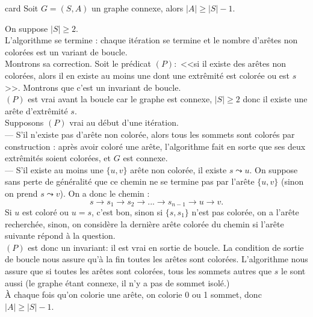 \documentclass[french, 11pt]{article}
\begin{document}
\begin{prop}{}{card}
    Soit $G=(S,A)$ un graphe connexe, alors $|A|\geq|S|-1$.
    \tcblower
    \begin{algorithm}[H]
        \caption{}
    \end{algorithm}
    On suppose $|S|\geq2$.\\
    L'algorithme se termine : chaque itération se termine et le nombre d'arêtes non colorées est un variant de boucle.\\
    Montrons sa correction. Soit le prédicat $(P):$ <<si il existe des arêtes non colorées, alors il en existe au moins une dont une extrêmité est colorée ou est $s$>>. Montrons que c'est un invariant de boucle.\\
    $(P)$ est vrai avant la boucle car le graphe est connexe, $|S|\geq2$ donc il existe une arête d'extrêmité $s$.\\
    Supposons $(P)$ vrai au début d'une itération.\\
    --- S'il n'existe pas d'arête non colorée, alors tous les sommets sont colorés par construction : après avoir coloré une arête, l'algorithme fait en sorte que ses deux extrêmités soient colorées, et $G$ est connexe.\\
    --- S'il existe au moins une $\{u,v\}$ arête non colorée, il existe $s\leadsto u$. On suppose sans perte de généralité que ce chemin ne se termine pas par l'arête $\{u,v\}$ (sinon on prend $s\leadsto v$). On a donc le chemin : \begin{equation*}s\to s_1 \to s_2 \to ... \to s_{n-1} \to u \to v.\end{equation*}
    Si $u$ est coloré ou $u=s$, c'est bon, sinon si $\{s,s_1\}$ n'est pas colorée, on a l'arête recherchée, sinon, on considère la dernière arête colorée du chemin si l'arête suivante répond à la question.\\
    $(P)$ est donc un invariant: il est vrai en sortie de boucle. La condition de sortie de boucle nous assure qu'à la fin toutes les arêtes sont colorées. L'algorithme nous assure que si toutes les arêtes sont colorées, tous les sommets autres que $s$ le sont aussi (le graphe étant connexe, il n'y a pas de sommet isolé.)\\
    À chaque fois qu'on colorie une arête, on colorie 0 ou 1 sommet, donc $|A|\geq|S|-1$.
\end{prop}
\end{document}
